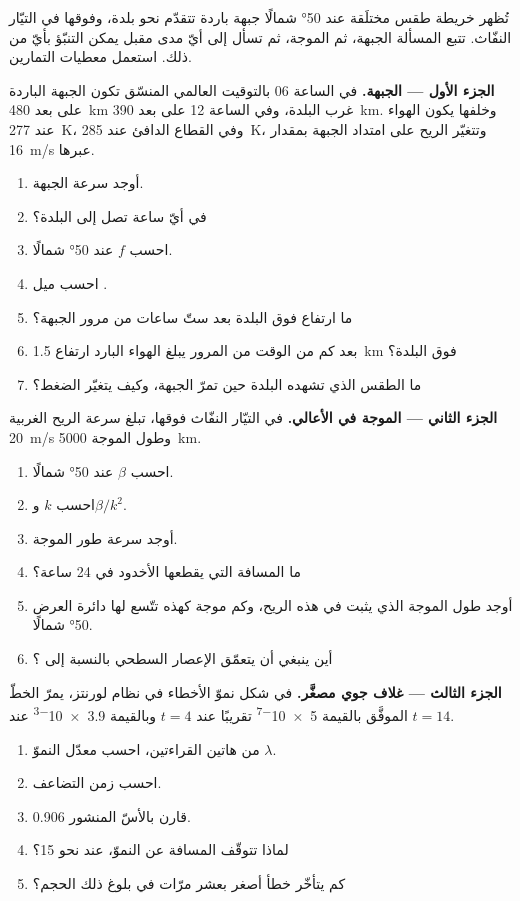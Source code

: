 \begin{problem}\label{pb:b2:weather-systems:1}
تُظهر خريطة طقس مختلَقة عند \ang{50} شمالًا جبهة باردة تتقدّم نحو بلدة، وفوقها 
في التيّار النفّاث. تتبع المسألة الجبهة، ثم الموجة، ثم تسأل إلى أيّ مدى
مقبل يمكن التنبّؤ بأيّ من ذلك. استعمل معطيات التمارين.

\medskip\noindent\textbf{الجزء الأول --- الجبهة.}
في الساعة 06 بالتوقيت العالمي المنسّق تكون الجبهة الباردة على بعد \qty{480}{km} غرب البلدة، وفي الساعة 12 على بعد \qty{390}{km}. وخلفها
يكون الهواء عند \qty{277}{K}، وفي القطاع الدافئ عند \qty{285}{K}، وتتغيّر الريح على امتداد الجبهة
بمقدار \qty{16}{m/s} عبرها.
\begin{enumerate}
  \item أوجد سرعة الجبهة.
  \item في أيّ ساعة تصل إلى البلدة؟
  \item احسب $f$ عند \ang{50} شمالًا.
  \item احسب ميل .
  \item ما ارتفاع  فوق البلدة بعد ستّ ساعات من مرور الجبهة؟
  \item بعد كم من الوقت من المرور يبلغ الهواء البارد ارتفاع \qty{1.5}{km} فوق البلدة؟
  \item ما الطقس الذي تشهده البلدة حين تمرّ الجبهة، وكيف يتغيّر الضغط؟
\end{enumerate}

\medskip\noindent\textbf{الجزء الثاني --- الموجة في الأعالي.}
في التيّار النفّاث فوقها، تبلغ سرعة الريح الغربية \qty{20}{m/s} وطول الموجة \qty{5000}{km}.
\begin{enumerate}[resume]
  \item احسب $\beta$ عند \ang{50} شمالًا.
  \item احسب $k$ و$\beta/k^2$.
  \item أوجد سرعة طور الموجة.
  \item ما المسافة التي يقطعها الأخدود في 24 ساعة؟
  \item أوجد طول الموجة الذي يثبت في هذه الريح، وكم موجة كهذه تتّسع لها
        دائرة العرض \ang{50} شمالًا.
  \item أين ينبغي أن يتعمّق الإعصار السطحي بالنسبة إلى ؟
\end{enumerate}

\medskip\noindent\textbf{الجزء الثالث --- غلاف جوي مصغَّر.}
في شكل نموّ الأخطاء في نظام لورنتز، يمرّ الخطّ الموفَّق بالقيمة
\num{5e-7} تقريبًا عند $t = 4$ وبالقيمة \num{3.9e-3} عند $t = 14$.
\begin{enumerate}[resume]
  \item من هاتين القراءتين، احسب معدّل النموّ $\lambda$.
  \item احسب زمن التضاعف.
  \item قارن بالأسّ المنشور 0.906.
  \item لماذا تتوقّف المسافة عن النموّ، عند نحو 15؟
  \item كم يتأخّر خطأ أصغر بعشر مرّات في بلوغ ذلك الحجم؟
\end{enumerate}


\end{problem}
